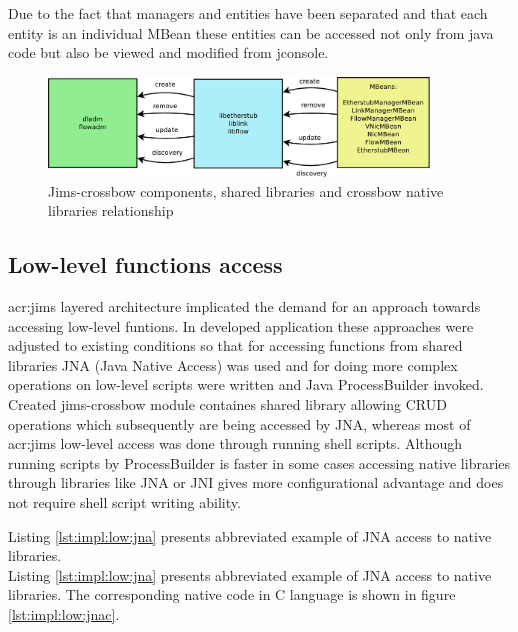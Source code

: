 \documentclass[11pt]{book}
\begin{document}
		Due to the fact that managers and entities have been separated and that each entity is an individual MBean these
		entities can be accessed not only from java code but also be viewed and modified from jconsole.

		\begin{figure}[H]
			\begin{center}
			\includegraphics[width=0.9\textwidth]{img/impl/crossbowLibsDiagram.pdf}
			\end{center}
			\caption{Jims-crossbow components, shared libraries and crossbow native libraries relationship}
		\end{figure} 
		
		\subsection{Low-level functions access}
			\label{sec:impl:low}

			\gls{acr:jims} layered architecture implicated the demand for an approach towards accessing low-level funtions. In developed
			application these approaches were adjusted to existing conditions so that for accessing functions from shared
			libraries JNA (Java Native Access) was used and for doing more complex operations on low-level scripts were
			written and Java ProcessBuilder invoked. Created jims-crossbow module containes shared library allowing CRUD
			operations which subsequently are being accessed by JNA, whereas most of \gls{acr:jims} low-level access was done through
			running shell scripts. Although running scripts by ProcessBuilder is faster in some cases accessing native
			libraries through libraries like JNA or JNI gives more configurational advantage and does not require shell script
			writing ability.

			Listing \ref{lst:impl:low:jna} presents abbreviated example of JNA access to native libraries. \\
			Listing \ref{lst:impl:low:jna} presents abbreviated example of JNA access to native libraries. The corresponding
			native code in C language is shown in figure \ref{lst:impl:low:jnac}. \\
 	
\end{document}

